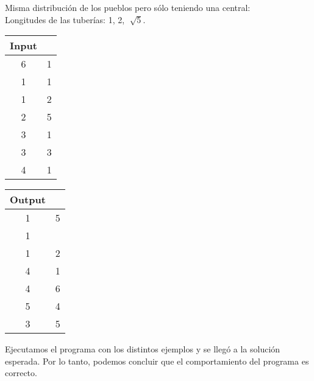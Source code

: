 \documentclass[11pt, a4paper, twoside]{article}
\begin{document}
\begin{itemize}
\begin{itemize}
				Misma distribuci\'on de los pueblos pero s\'olo teniendo una central: \\
				Longitudes de las tuber\'ias: 1, 2, $\sqrt[] {5}$. \\
				   \begin{minipage}{0.2\textwidth}
						\begin{tabular}{cc}
						   Input \\
						   \hline
						   6 & 1 \\
						   1 & 1 \\
						   1 & 2 \\
						   2 & 5 \\
						   3 & 1 \\
						   3 & 3 \\
						   4 & 1 \\
						\end{tabular}
				   \end{minipage} 
				   \begin{minipage}{0.2\textwidth}
						\begin{tabular}{cc}
						   Output \\
						   \hline
						   1 & 5 \\
						   1 &   \\
						   1 & 2 \\
						   4 & 1 \\
						   4 & 6 \\
						   5 & 4 \\
						   3 & 5 \\
						\end{tabular}
				   \end{minipage} 
			\end{itemize}
		
\end{itemize}

Ejecutamos el programa con los distintos ejemplos y se lleg\'o a la soluci\'on esperada. 
Por lo tanto, podemos concluir que el comportamiento del programa es correcto. 
\end{document}
